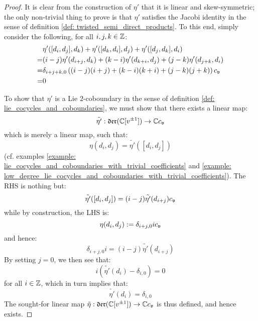             \begin{proof}
                It is clear from the construction of $\eta'$ that it is linear and skew-symmetric; the only non-trivial thing to prove is that $\eta'$ satisfies the Jacobi identity in the sense of definition \ref{def: twisted_semi_direct_products}. To this end, simply consider the following, for all $i, j, k \in \mathbb{Z}$:
                    $$
                        \begin{aligned}
                            & \eta'([d_i, d_j], d_k) + \eta'([d_k, d_i], d_j) + \eta'([d_j, d_k], d_i)
                            \\
                            = & (i - j) \eta'(d_{i + j}, d_k) + (k - i) \eta'(d_{k + i}, d_j) + (j - k) \eta'(d_{j + k}, d_i)
                            \\
                            = & \delta_{i + j + k, 0} \left( (i - j) (i + j) + (k - i) (k + i) + (j - k) (j + k) \right) c_{\mathfrak{v}}
                            \\
                            = & 0
                        \end{aligned}
                    $$
                    
                To show that $\eta'$ is a Lie $2$-coboundary in the sense of definition \ref{def: lie_cocycles_and_coboundaries}, we must show that there exists a linear map:
                    $$\tilde{\eta'}: \mathfrak{der}(\mathbb{C}[v^{\pm 1}]) \to \mathbb{C} c_{\mathfrak{v}}$$
                which is merely a linear map, such that:
                    $$\eta(d_i, d_j) = \tilde{\eta'}([d_i, d_j])$$
                (cf. examples \ref{example: lie_cocycles_and_coboundaries_with_trivial_coefficients} and \ref{example: low_degree_lie_cocycles_and_coboundaries_with_trivial_coefficients}). The RHS is nothing but:
                    $$\tilde{\eta'}([d_i, d_j]) = (i - j) \tilde{\eta'}(d_{i + j}) c_{\mathfrak{v}}$$
                while by construction, the LHS is:
                    $$\eta(d_i, d_j) := \delta_{i + j, 0} i c_{\mathfrak{v}}$$
                and hence:
                    $$\delta_{i + j, 0} i = (i - j) \tilde{\eta'}(d_{i + j})$$
                By setting $j = 0$, we then see that:
                    $$i (\tilde{\eta'}(d_i) - \delta_{i, 0}) = 0$$
                for all $i \in \mathbb{Z}$, which in turn implies that:
                    $$\tilde{\eta'}(d_i) = \delta_{i, 0}$$
                The sought-for linear map $\tilde{\eta}: \mathfrak{der}(\mathbb{C}[v^{\pm 1}]) \to \mathbb{C} c_{\mathfrak{v}}$ is thus defined, and hence exists.
            \end{proof}
